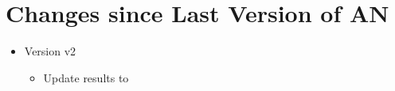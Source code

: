 \section{Changes since Last Version of AN}
\label{sec:changes}

\begin{itemize}
\item Version v2
  \begin{itemize}
  \item Update results to \lumi
  \end{itemize}
\end{itemize}
